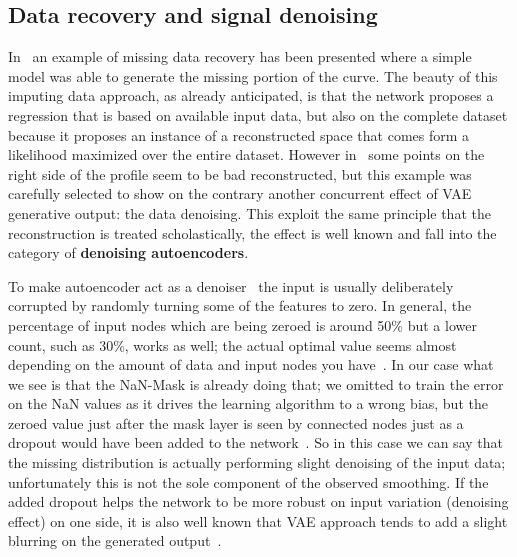 \subsection{Data recovery and signal denoising}
\label{section:recovery}
In~\Figure{\ref{fig:missing data example}} an example of missing data recovery has been presented where a simple  model was able to generate the missing portion of the curve. The beauty of this imputing data approach, as already anticipated, is that the network proposes a regression that is based on available input data, but also on the complete dataset because it proposes an instance of a reconstructed space that comes form a likelihood maximized over the entire dataset.
However in~\Figure{\ref{fig:missing data example_b}} some points on the right side of the profile seem to be bad reconstructed, but this example was carefully selected to show on the contrary another concurrent effect of \acs{VAE} generative output: the data denoising.
This exploit the same principle that the reconstruction is treated scholastically, the effect is well known and fall into the category of \textbf{denoising autoencoders}.

To make autoencoder act as a denoiser~\cite{vincent_et_al_denoise2008} the input is usually deliberately corrupted by randomly turning some of the features to zero. In general, the percentage of input nodes which are being zeroed is around 50\% but a lower count, such as 30\%, works as well; the actual optimal value seems almost depending on the amount of data and input nodes you have~\cite{ae_denoise}. In our case what we see is that the NaN-Mask is already doing that; we omitted to train the error on the NaN values as it drives the learning algorithm to a wrong bias, but the zeroed value just after the mask layer is seen by connected nodes just as a dropout would have been added to the network~\cite{Srivastava:2014:DSW:2627435.2670313}. So in this case we can say that the missing distribution is actually performing slight denoising of the input data; unfortunately this is not the sole component of the observed smoothing. If the added dropout helps the network to be more robust on input variation (denoising effect) on one side, it is also well known that VAE approach tends to add a slight blurring on the generated output~\cite{ghosh2019variational}. 


